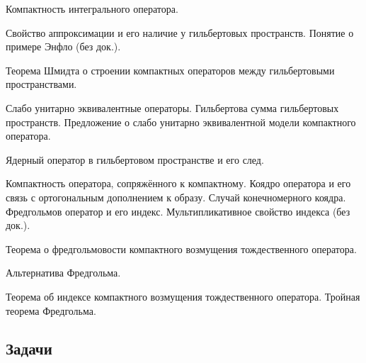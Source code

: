 \documentclass[a4paper]{article}
\begin{document}
\begin{nums}{-3}
Компактность интегрального оператора.
\item Свойство аппроксимации и его наличие у гильбертовых пространств. Понятие о примере Энфло (без док.).
\item Теорема Шмидта о строении компактных операторов между гильбертовыми пространствами.
\item Слабо унитарно эквивалентные операторы. Гильбертова сумма гильбертовых пространств.
Предложение о слабо унитарно эквивалентной модели компактного оператора.
\item Ядерный оператор в гильбертовом пространстве и его след.
\item Компактность оператора, сопряжённого к компактному. Коядро оператора и его связь с ортогональным дополнением к образу.
Случай конечномерного коядра. Фредгольмов оператор и его индекс. Мультипликативное свойство индекса (без док.).
\item Теорема о фредгольмовости компактного возмущения тождественного оператора.
\item Альтернатива Фредгольма.
\item Теорема об индексе компактного возмущения тождественного оператора. Тройная теорема Фредгольма.
\end{nums}

\subsection*{Задачи}
\end{document}
